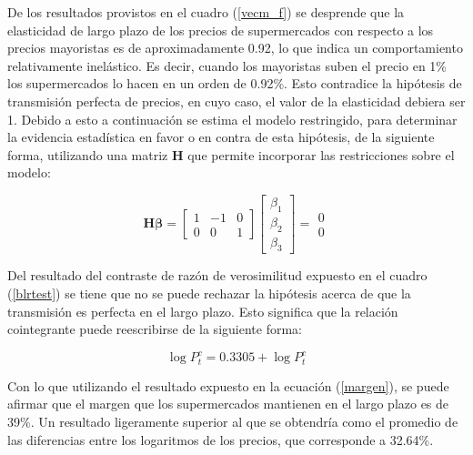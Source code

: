 \documentclass[12pt, twoside]{book}\usepackage[]{graphicx}\usepackage[]{color}
\numberwithin{equation}{section}
\numberwithin{theorem}{section}
\numberwithin{teorema}{section}
\numberwithin{defi}{section}
\numberwithin{prop}{section}
\numberwithin{defi}{section}
\theoremstyle{plain}
\begin{document}
De los resultados provistos en el cuadro (\ref{vecm_f}) se desprende que la elasticidad de largo plazo de los precios de supermercados con respecto a los precios mayoristas es de aproximadamente 0.92, lo que indica un comportamiento relativamente inelástico. Es decir, cuando los mayoristas suben el precio en 1\% los supermercados lo hacen en un orden de 0.92\%. Esto contradice la hipótesis de transmisión perfecta de precios, en cuyo caso, el valor de la elasticidad debiera ser 1. Debido a esto a continuación se estima el modelo restringido, para determinar la evidencia estadística en favor o en contra de esta hipótesis, de la siguiente forma, utilizando una matriz $\mathbf{H}$ que permite incorporar las restricciones sobre el modelo: 

\begin{equation}
\mathbf{H}\boldsymbol{\beta} = \left[\begin{array}{ccc} 1 & -1 & 0 \\ 
                                                            0 &  0 &  1 \end{array}\right]
                                   \left[\begin{array}{c} 
                                    \beta_{1} \\ \beta_{2} \\ \beta_{3} \end{array}\right]=\begin{array}{c} 0 \\ 0 \end{array}
\end{equation}

Del resultado del contraste de razón de verosimilitud expuesto en el cuadro (\ref{blrtest}) se tiene que no se puede rechazar la hipótesis acerca de que la transmisión es perfecta en el largo plazo. Esto significa que la relación cointegrante puede reescribirse de la siguiente forma: 

\begin{equation}
\log P_{t}^{c} = 0.3305+\log P_{t}^{c}
\end{equation}

Con lo que utilizando el resultado expuesto en la ecuación (\ref{margen}), se puede afirmar que el margen que los supermercados mantienen en el largo plazo es de 39\%. Un resultado ligeramente superior al que se obtendría como el promedio de las diferencias entre los logaritmos de los precios, que corresponde a 32.64\%. 
\end{document}

